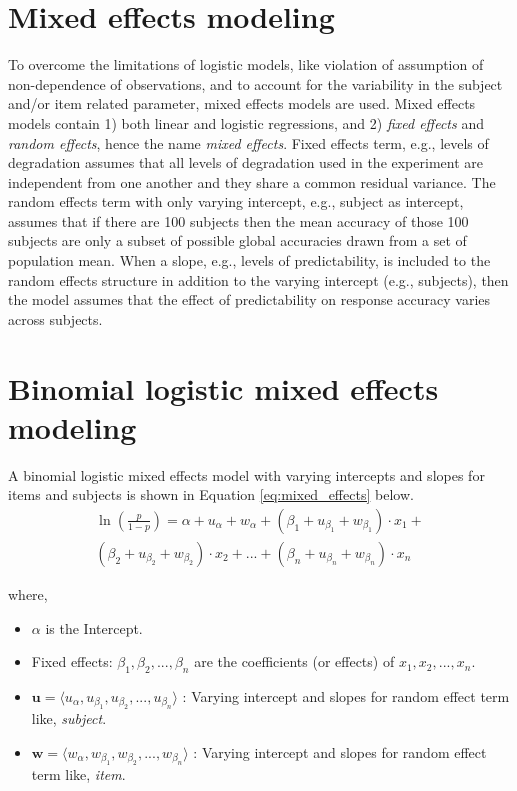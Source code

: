 \documentclass[a4paper, nobind]{templates/ociamthesis}
\providecommand{\tightlist}{%
  \setlength{\itemsep}{0pt}\setlength{\parskip}{0pt}}
\begin{document}
\hypertarget{mixed-effects-modeling}{%
\section{Mixed effects modeling}\label{mixed-effects-modeling}}

To overcome the limitations of logistic models, like violation of assumption of non-dependence of observations, and to account for the variability in the subject and/or item related parameter, mixed effects models are used.
Mixed effects models contain 1) both linear and logistic regressions, and 2) \emph{fixed effects} and \emph{random effects}, hence the name \emph{mixed effects}.
Fixed effects term, e.g., levels of degradation assumes that all levels of degradation used in the experiment are independent from one another and they share a common residual variance.
The random effects term with only varying intercept, e.g., subject as intercept, assumes that if there are 100 subjects then the mean accuracy of those 100 subjects are only a subset of possible global accuracies drawn from a set of population mean.
When a slope, e.g., levels of predictability, is included to the random effects structure in addition to the varying intercept (e.g., subjects), then the model assumes that the effect of predictability on response accuracy varies across subjects.

\hypertarget{binomial-logistic-mixed-effects-model}{%
\section{Binomial logistic mixed effects modeling}\label{binomial-logistic-mixed-effects-model}}

A binomial logistic mixed effects model with varying intercepts and slopes for items and subjects is shown in Equation \ref{eq:mixed_effects} below.
\begin{align} \label{eq:mixed_effects}
\ln (\frac{p}{1-p}) = \alpha + u_{\alpha} + w_{\alpha} +
                      (\beta_{1} + u_{\beta_{1}} + w_{\beta_{1}})\cdot {x_1} + \nonumber\\
                      (\beta_{2} + u_{\beta_{2}} + w_{\beta_{2}})\cdot {x_2} + ... +
                      (\beta_{n} + u_{\beta_{n}} + w_{\beta_{n}})\cdot {x_n} 
\end{align}

where,

\begin{itemize}
\tightlist
\item
  \(\alpha\) is the Intercept.
\item
  Fixed effects: \(\beta_{1}, \beta_{2}, ..., \beta_{n}\) are the coefficients (or effects) of \(x_1, x_2, ...,x_n\).
\item
  \(\boldsymbol{u} = \langle u_{\alpha}, u_{\beta_1}, u_{\beta_2}, ..., u_{\beta_n} \rangle\) : Varying intercept and slopes for random effect term like, \emph{subject}.
\item
  \(\boldsymbol{w} = \langle w_{\alpha}, w_{\beta_1}, w_{\beta_2}, ..., w_{\beta_n} \rangle\) : Varying intercept and slopes for random effect term like, \emph{item}.
\end{itemize}
\end{document}
